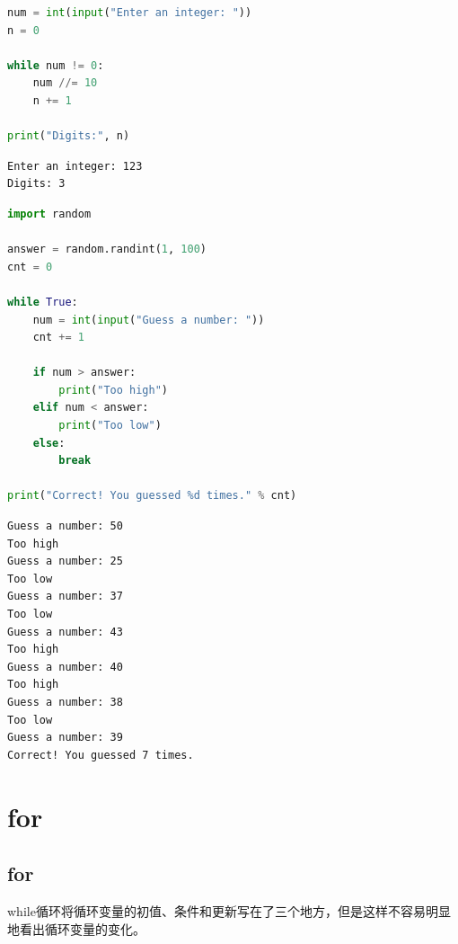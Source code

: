 
\begin{lstlisting}[language=Python]
num = int(input("Enter an integer: "))
n = 0

while num != 0:
	num //= 10
	n += 1

print("Digits:", n)
\end{lstlisting}

\begin{tcolorbox}
	\begin{verbatim}
Enter an integer: 123
Digits: 3
\end{verbatim}
\end{tcolorbox}

\vspace{0.5cm}


\begin{lstlisting}[language=Python]
import random

answer = random.randint(1, 100)
cnt = 0

while True:
	num = int(input("Guess a number: "))
	cnt += 1

	if num > answer:
		print("Too high")
	elif num < answer:
		print("Too low")
	else:
		break

print("Correct! You guessed %d times." % cnt)
\end{lstlisting}

\begin{tcolorbox}
	\begin{verbatim}
Guess a number: 50
Too high
Guess a number: 25
Too low
Guess a number: 37
Too low
Guess a number: 43
Too high
Guess a number: 40
Too high
Guess a number: 38
Too low
Guess a number: 39
Correct! You guessed 7 times.
\end{verbatim}
\end{tcolorbox}

\newpage

\section{for}

\subsection{for}

while循环将循环变量的初值、条件和更新写在了三个地方，但是这样不容易明显地看出循环变量的变化。\\

